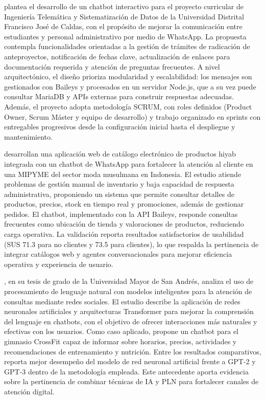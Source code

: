 \cite{zarabanda2024desarrollo} plantea el desarrollo de un chatbot interactivo para el proyecto curricular de Ingenier{\'i}a Telem{\'a}tica y Sistematizaci{\'o}n de Datos de la Universidad Distrital Francisco Jos{\'e} de Caldas, con el prop{\'o}sito de mejorar la comunicaci{\'o}n entre estudiantes y personal administrativo por medio de WhatsApp. La propuesta contempla funcionalidades orientadas a la gesti{\'o}n de tr{\'a}mites de radicaci{\'o}n de anteproyectos, notificaci{\'o}n de fechas clave, actualizaci{\'o}n de enlaces para documentaci{\'o}n requerida y atenci{\'o}n de preguntas frecuentes. A nivel arquitect{\'o}nico, el dise{\~n}o prioriza modularidad y escalabilidad: los mensajes son gestionados con Baileys y procesados en un servidor Node.js, que a su vez puede consultar MariaDB y APIs externas para construir respuestas adecuadas. Adem{\'a}s, el proyecto adopta metodolog{\'i}a SCRUM, con roles definidos (Product Owner, Scrum M{\'a}ster y equipo de desarrollo) y trabajo organizado en sprints con entregables progresivos desde la configuraci{\'o}n inicial hasta el despliegue y mantenimiento.

\cite{elsen2025hijab} desarrollan una aplicaci{\'o}n web de cat{\'a}logo electr{\'o}nico de productos hiyab integrada con un chatbot de WhatsApp para fortalecer la atenci{\'o}n al cliente en una MIPYME del sector moda musulmana en Indonesia. El estudio atiende problemas de gesti{\'o}n manual de inventario y baja capacidad de respuesta administrativa, proponiendo un sistema que permite consultar detalles de productos, precios, stock en tiempo real y promociones, adem{\'a}s de gestionar pedidos. El chatbot, implementado con la API Baileys, responde consultas frecuentes como ubicaci{\'o}n de tienda y valoraciones de productos, reduciendo carga operativa. La validaci{\'o}n reporta resultados satisfactorios de usabilidad (SUS 71.3 para no clientes y 73.5 para clientes), lo que respalda la pertinencia de integrar cat{\'a}logos web y agentes conversacionales para mejorar eficiencia operativa y experiencia de usuario.


\cite{vega2023nlp}, en su tesis de grado de la Universidad Mayor de San Andr{\'e}s, analiza el uso de procesamiento de lenguaje natural con modelos inteligentes para la atenci{\'o}n de consultas mediante redes sociales. El estudio describe la aplicaci{\'o}n de redes neuronales artificiales y arquitecturas Transformer para mejorar la comprensi{\'o}n del lenguaje en chatbots, con el objetivo de ofrecer interacciones m{\'a}s naturales y efectivas con los usuarios. Como caso aplicado, propone un chatbot para el gimnasio CrossFit capaz de informar sobre horarios, precios, actividades y recomendaciones de entrenamiento y nutrici{\'o}n. Entre los resultados comparativos, reporta mejor desempe{\~n}o del modelo de red neuronal artificial frente a GPT-2 y GPT-3 dentro de la metodolog{\'i}a empleada. Este antecedente aporta evidencia sobre la pertinencia de combinar t{\'e}cnicas de IA y PLN para fortalecer canales de atenci{\'o}n digital.
